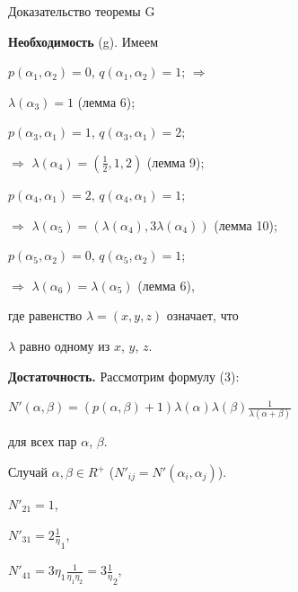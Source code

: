 \begin{pf*}{Доказательство теоремы G}


{\bf Необходимость} (g).  Имеем





$p(\alpha_1,\alpha_2)=0$, $q(\alpha_1,\alpha_2)=1$; $\Rightarrow$


$\lambda(\alpha_3)=1$ (лемма 6);





$p(\alpha_3,\alpha_1)=1$, $q(\alpha_3,\alpha_1)=2$;


$\Rightarrow$ $\lambda(\alpha_4)=(\frac12,1,2)$ (лемма 9);





$p(\alpha_4,\alpha_1)=2$, $q(\alpha_4,\alpha_1)=1$;


$\Rightarrow$ $\lambda(\alpha_5)=


(\lambda(\alpha_4),3\lambda(\alpha_4))$ (лемма 10);





$p(\alpha_5,\alpha_2)=0$, $q(\alpha_5,\alpha_2)=1$;


$\Rightarrow$ $\lambda(\alpha_6)=\lambda(\alpha_5)$ (лемма 6),





\noindent{}где равенство $\lambda=(x,y,z)$ означает, что 


$\lambda$ равно одному из $x$, $y$, $z$.


\medskip





{\bf Достаточность.} Рассмотрим формулу (3): 


$N'(\alpha,\beta)=(p(\alpha,\beta)+1)\lambda(\alpha)\lambda(\beta)


\frac1{\lambda(\alpha+\beta)}$


для всех пар $\alpha$, $\beta$.





Случай $\alpha,\beta\in R^+$ ($N'_{ij}=N'(\alpha_i,\alpha_j)$).





\noindent{}$N'_{21}=1$,


$N'_{31}=2\frac1\eta_1$,


$N'_{41}=3\eta_1\frac1{\eta_1\eta_2}=3\frac1\eta_2$,



\end{pf*}
